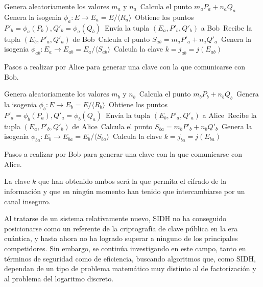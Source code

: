 \documentclass[
  a4paper,
  12pt,
  spanish,
]{scrartcl}
\begin{document}
\begin{algorithm}[h]
  Genera aleatoriamente los valores \(m_a\) y \(n_a\)\,\;
  Calcula el punto \(m_aP_a + n_aQ_a\)\,\;
  Genera la isogenia \(\phi_a: E \to E_a = E/\langle R_a \rangle\)\,\;
  Obtiene los puntos \(P'_b = \phi_a(P_b), Q'_b = \phi_a(Q_b)\)\,\;
  Envía la tupla \((E_a, P'_b, Q'_b)\) a Bob\,\;
  Recibe la tupla \((E_b, P'_a, Q'_a)\) de Bob\,\;
  Calcula el punto \(S_{ab} = m_aP'_a + n_aQ'_a\)\,\;
  Genera la isogenia \(\phi_{ab} : E_a \to E_{ab} = E_a/\langle S_{ab} \rangle\)\,\;
  Calcula la clave \(k = j_{ab} = j(E_{ab})\)\,\;

  \caption{Pasos a realizar por Alice para generar una clave con la que comunicarse con Bob.}
  \label{algo:sidh-alice}
\end{algorithm}

\begin{algorithm}[h]
  Genera aleatoriamente los valores \(m_b\) y \(n_b\)\,\;
  Calcula el punto \(m_bP_b + n_bQ_b\)\,\;
  Genera la isogenia \(\phi_b: E \to E_b = E/\langle R_b \rangle\)\,\;
  Obtiene los puntos \(P'_a = \phi_b(P_a), Q'_a = \phi_b(Q_a)\)\,\;
  Envía la tupla \((E_b, P'_a, Q'_a)\) a Alice\,\;
  Recibe la tupla \((E_a, P'_b, Q'_b)\) de Alice\,\;
  Calcula el punto \(S_{ba} = m_bP'_b + n_bQ'_b\)\,\;
  Genera la isogenia \(\phi_{ba} : E_b \to E_{ba} = E_b/\langle S_{ba} \rangle\)\,\;
  Calcula la clave \(k = j_{ba} = j(E_{ba})\)\,\;

  \caption{Pasos a realizar por Bob para generar una clave con la que comunicarse con Alice.}
  \label{algo:sidh-bob}
\end{algorithm}

La clave \(k\) que han obtenido ambos será la que permita el cifrado de la información y que en ningún momento han tenido que intercambiarse por un canal inseguro.

Al tratarse de un sistema relativamente nuevo, SIDH no ha conseguido posicionarse como un referente de la criptografía de clave pública en la era cuántica, y hasta ahora no ha logrado superar a ninguno de los principales competidores. Sin embargo, se continúa investigando en este campo, tanto en términos de seguridad como de eficiencia, buscando algoritmos que, como SIDH, dependan de un tipo de problema matemático muy distinto al de factorización y al problema del logaritmo discreto.


\newpage
\printbibliography
\end{document}
